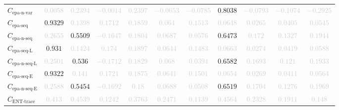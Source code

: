 \documentclass{standalone}
\newcommand{\enttracename}{\text{ENT-trace}}
\newcommand{\enttrace}{C_{\enttracename}}
\newcommand{\epanormvariantname}{\text{epa-n-var}}
\newcommand{\epanormvariant}{C_{\epanormvariantname}}
\newcommand{\epasequencename}{\text{epa-seq}}
\newcommand{\epasequence}{C_{\epasequencename}}
\newcommand{\epanormsequencename}{\text{epa-n-seq}}
\newcommand{\epanormsequence}{C_{\epanormsequencename}}
\newcommand{\epasequencelname}{\text{epa-seq-L}}
\newcommand{\epasequencel}{C_{\epasequencelname}}
\newcommand{\epanormsequencelname}{\text{epa-n-seq-L}}
\newcommand{\epanormsequencel}{C_{\epanormsequencelname}}
\newcommand{\epasequenceename}{\text{epa-seq-E}}
\newcommand{\epasequencee}{C_{\epasequenceename}}
\newcommand{\epanormsequenceename}{\text{epa-n-seq-E}}
\newcommand{\epanormsequencee}{C_{\epanormsequenceename}}
\begin{document}
\begin{tabular}{lcccccccccc}
$\epanormvariant$ & \textcolor{lightgray}{$0.0058$} & \textcolor{lightgray}{$0.2394$} & \textcolor{lightgray}{$-0.0014$} & \textcolor{lightgray}{$0.2397$} & \textcolor{lightgray}{$-0.0653$} & \textcolor{lightgray}{$-0.0785$} & $0.8038$ & \textcolor{lightgray}{$-0.0793$} & \textcolor{lightgray}{$-0.1074$} & \textcolor{lightgray}{$-0.2925$} \\ 
$\epasequence$ & $0.9329$ & \textcolor{lightgray}{$0.1398$} & \textcolor{lightgray}{$0.1712$} & \textcolor{lightgray}{$0.1859$} & \textcolor{lightgray}{$0.064$} & \textcolor{lightgray}{$0.1513$} & \textcolor{lightgray}{$0.0648$} & \textcolor{lightgray}{$0.0265$} & \textcolor{lightgray}{$0.0405$} & \textcolor{lightgray}{$0.0545$} \\ 
$\epanormsequence$ & \textcolor{lightgray}{$0.2655$} & $0.5509$ & \textcolor{lightgray}{$-0.1647$} & \textcolor{lightgray}{$0.1804$} & \textcolor{lightgray}{$0.0687$} & \textcolor{lightgray}{$0.0576$} & $0.6473$ & \textcolor{lightgray}{$0.172$} & \textcolor{lightgray}{$0.1327$} & \textcolor{lightgray}{$0.1944$} \\ 
$\epasequencel$ & $0.931$ & \textcolor{lightgray}{$0.1424$} & \textcolor{lightgray}{$0.174$} & \textcolor{lightgray}{$0.1897$} & \textcolor{lightgray}{$0.0644$} & \textcolor{lightgray}{$0.1483$} & \textcolor{lightgray}{$0.0663$} & \textcolor{lightgray}{$0.0274$} & \textcolor{lightgray}{$0.0419$} & \textcolor{lightgray}{$0.0588$} \\ 
$\epanormsequencel$ & \textcolor{lightgray}{$0.2501$} & $0.536$ & \textcolor{lightgray}{$-0.1712$} & \textcolor{lightgray}{$0.1829$} & \textcolor{lightgray}{$0.068$} & \textcolor{lightgray}{$0.0394$} & $0.6582$ & \textcolor{lightgray}{$0.1693$} & \textcolor{lightgray}{$0.121$} & \textcolor{lightgray}{$0.1933$} \\ 
$\epasequencee$ & $0.9322$ & \textcolor{lightgray}{$0.141$} & \textcolor{lightgray}{$0.1721$} & \textcolor{lightgray}{$0.1875$} & \textcolor{lightgray}{$0.0641$} & \textcolor{lightgray}{$0.1501$} & \textcolor{lightgray}{$0.0654$} & \textcolor{lightgray}{$0.0269$} & \textcolor{lightgray}{$0.0411$} & \textcolor{lightgray}{$0.0564$} \\ 
$\epanormsequencee$ & \textcolor{lightgray}{$0.2588$} & $0.5454$ & \textcolor{lightgray}{$-0.1692$} & \textcolor{lightgray}{$0.18$} & \textcolor{lightgray}{$0.0688$} & \textcolor{lightgray}{$0.0508$} & $0.6519$ & \textcolor{lightgray}{$0.1704$} & \textcolor{lightgray}{$0.1276$} & \textcolor{lightgray}{$0.1969$} \\ 
$\enttrace$ & \textcolor{lightgray}{$0.413$} & \textcolor{lightgray}{$0.4539$} & \textcolor{lightgray}{$0.1242$} & \textcolor{lightgray}{$0.3763$} & \textcolor{lightgray}{$0.2471$} & \textcolor{lightgray}{$0.1139$} & \textcolor{lightgray}{$0.4564$} & \textcolor{lightgray}{$0.2328$} & \textcolor{lightgray}{$0.1911$} & \textcolor{lightgray}{$0.148$} \\ 

\end{tabular}
\end{document}
